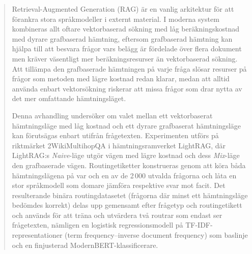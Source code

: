 \documentclass[english, bibtex]{kththesis}               %
\newcommand*{\engExpl}[1]{\todo[inline, backgroundcolor=kth-lightgreen40]{#1}} %
\renewcommand\engExpl[1]{}
\numberwithin{listing}{chapter}
\begin{document}
\begin{abstract}
\engExpl{The abstract in the language used for the thesis should be the first abstract, while the Summary/Sammanfattning in the other language can follow}
\begin{scontents}[store-env=abstracts,print-env=true]
Retrieval-Augmented Generation (RAG) är en vanlig arkitektur för att förankra stora språkmodeller i externt material. I moderna system kombineras allt oftare vektorbaserad sökning med låg beräkningskostnad med dyrare grafbaserad hämtning, eftersom grafbaserad hämtning kan hjälpa till att besvara frågor vars belägg är fördelade över flera dokument men kräver väsentligt mer beräkningsresurser än vektorbaserad sökning. Att tillämpa den grafbaserade hämtningen på varje fråga slösar resurser på frågor som metoden med lägre kostnad redan klarar, medan att alltid använda enbart vektorsökning riskerar att missa frågor som drar nytta av det mer omfattande hämtningsläget.

Denna avhandling undersöker om valet mellan ett vektorbaserat hämtningsläge med låg kostnad och ett dyrare grafbaserat hämtningsläge kan förutsägas enbart utifrån frågetexten. Experimenten utförs på riktmärket 2WikiMultihopQA i hämtningsramverket LightRAG, där LightRAG:s \emph{Naive}-läge utgör vägen med lägre kostnad och dess \emph{Mix}-läge den grafbaserade vägen. Routingetiketter konstrueras genom att köra båda hämtningslägena på var och en av de 2\,000 utvalda frågorna och låta en stor språkmodell som domare jämföra respektive svar mot facit. Det resulterande binära routingdatasetet (frågorna där minst ett hämtningsläge bedömdes korrekt) delas upp gemensamt efter frågetyp och routingetikett och används för att träna och utvärdera två routrar som endast ser frågetexten, nämligen en logistisk regressionsmodell på TF-IDF-representationer (term frequency--inverse document frequency) som baslinje och en finjusterad ModernBERT-klassificerare.


\end{scontents}
\end{abstract}
\end{document}
